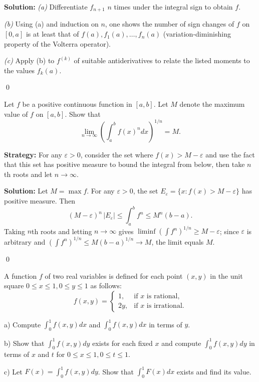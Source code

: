 \bigskip\noindent\textbf{Solution:}
\textit{(a)} Differentiate $f_{n+1}$ $n$ times under the integral sign to obtain $f$. 

\textit{(b)} Using (a) and induction on $n$, one shows the number of sign changes of $f$ on $[0,a]$ is at least that of $f(a),f_1(a),\dots,f_n(a)$ (variation-diminishing property of the Volterra operator).

\textit{(c)} Apply (b) to $f^{(k)}$ of suitable antiderivatives to relate the listed moments to the values $f_k(a)$.




\qed
\begin{problembox}
\begin{problemstatement}
Let $f$ be a positive continuous function in $[a, b]$. Let $M$ denote the maximum value of $f$ on $[a, b]$. Show that
\[\lim_{n \to \infty} \left( \int_{a}^{b} f(x)^{n} dx \right)^{1/n} = M.\]
\end{problemstatement}
\end{problembox}

\noindent\textbf{Strategy:} For any $\varepsilon > 0$, consider the set where $f(x) > M - \varepsilon$ and use the fact that this set has positive measure to bound the integral from below, then take $n$th roots and let $n \to \infty$.

\bigskip\noindent\textbf{Solution:}
Let $M=\max f$. For any $\varepsilon>0$, the set $E_\varepsilon=\{x:f(x)>M-\varepsilon\}$ has positive measure. Then
\[(M-\varepsilon)^n\,|E_\varepsilon|\le \int_a^b f^n\le M^n(b-a).
\]
Taking $n$th roots and letting $n\to\infty$ gives $\liminf (\int f^n)^{1/n}\ge M-\varepsilon$; since $\varepsilon$ is arbitrary and $(\int f^n)^{1/n}\le M(b-a)^{1/n}\to M$, the limit equals $M$.




\qed
\begin{problembox}
\begin{problemstatement}
A function $f$ of two real variables is defined for each point $(x, y)$ in the unit square $0 \leq x \leq 1, 0 \leq y \leq 1$ as follows:
\[f(x, y) = 
\begin{cases}
1, & \text{if } x \text{ is rational}, \\
2y, & \text{if } x \text{ is irrational}.
\end{cases}\]

a) Compute $\int_{0}^{1} f(x, y) dx$ and $\int_{0}^{1} f(x, y) dx$ in terms of $y$.

b) Show that $\int_{0}^{1} f(x, y) dy$ exists for each fixed $x$ and compute $\int_{0}^{1} f(x, y) dy$ in terms of $x$ and $t$ for $0 \leq x \leq 1, 0 \leq t \leq 1$.

c) Let $F(x) = \int_{0}^{1} f(x, y) dy$. Show that $\int_{0}^{1} F(x) dx$ exists and find its value.
\end{problemstatement}
\end{problembox}

